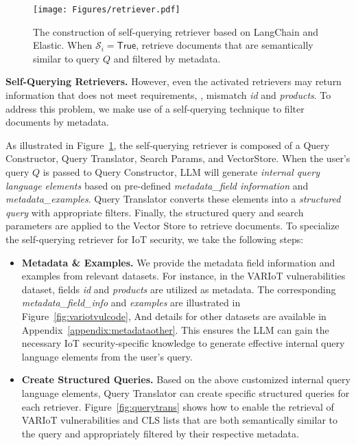 


\begin{figure}[h]
    \centering
    \texttt{[image: Figures/retriever.pdf]}
    \caption{The construction of self-querying retriever based on LangChain and Elastic. When $\mathcal{S}_i=\mathsf{True}$, retrieve documents that are semantically similar to query $Q$ and filtered by metadata.}
    \label{fig:retri}
\end{figure}


\smallskip
\noindent \textbf{Self-Querying Retrievers.}
However, even the activated retrievers may return information that does not meet requirements, \eg, mismatch \textit{id} and \textit{products}. To address this problem, we make use of a self-querying technique to filter documents by \textsf{metadata}. 




As illustrated in Figure~\ref{fig:retri}, the self-querying retriever is composed of a Query Constructor, Query Translator, Search Params, and VectorStore.
When the user's query $Q$ is passed to Query Constructor, LLM will generate \textit{internal query language elements} based on pre-defined \textit{metadata\_field information} and \textit{metadata\_examples}.
Query Translator converts these elements into a \textit{structured query} with appropriate filters. 
Finally, the structured query and search parameters are applied to the Vector Store to retrieve documents. 
To specialize the self-querying retriever for IoT security, we take the following steps:
\begin{itemize}
    \item[\textcircled{1}] \textbf{Metadata \& Examples.} We provide the metadata field information and examples from relevant datasets. For instance, in the VARIoT vulnerabilities dataset, fields \textit{id} and \textit{products} are utilized as metadata. The corresponding \textit{metadata\_field\_info} and \textit{examples} are illustrated in Figure~\ref{fig:variotvulcode}, And details for other datasets are available in Appendix~\ref{appendix:metadataother}. This ensures the LLM can gain the necessary IoT security-specific knowledge to generate effective internal query language elements from the user's query.
    
    \item[\textcircled{2}] \textbf{Create Structured Queries.} Based on the above customized internal query language elements, Query Translator can create specific structured queries for each retriever. 
    Figure~\ref{fig:querytrans} shows how to enable the retrieval of VARIoT vulnerabilities and CLS lists that are both semantically similar to the query and appropriately filtered by their respective metadata.
\end{itemize}


